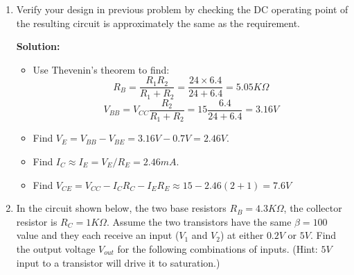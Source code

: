 \begin{enumerate}

 {\bf Solution:}
 
 \begin{itemize}
 \item Find $V_{CC}$: for the Q-point to be in the middle of the
   load line, we set $V_{CC}=2V_{CE}=2\times 7.5=15V$.
 \item Find $R_C$ and $R_E$: As $V_{CE}=V_{CC}-I_CR_C-I_ER_E\approx
   V_{CC}-I_C(R_C+R_E)$, we have $R_C+R_E=7.5/2.5\times 10^{-3}=3K\Omega$,
   i.e., $R_E=5K\Omega-R_C=1K\Omega$.
 \item Find desired $V_{BB}$: 
 	\[ V_{BB}=V_{be}+I_ER_E=0.7+2.5\times 10^{-3}\times 10^3=3.2V \]
 \item Find $R_B$: To satisfy $10R_B \le \beta_{min}R_E$, we let 
   $R_B=0.1\times \beta_{min} R_E=0.1\times 50\times 1000=5\;K\Omega$
 \item Find $R_1$ and $R_2$:
 \[	R_B=\frac{R_1R_2}{R_1+R_2}=5\;K\Omega \;\;\;\;\;\;\;\;
       V_{BB}=3.2V=V_{CC}\frac{R_2}{R_1+R_2}=15 \frac{R_2}{R_1+R_2} \]
 Solve these two equations (first divide the first equation by the second), 
 we obtain the two unknowns $R_1$ and $R_2$:
 \[	R_1=\frac{5\;K\Omega}{0.21}=24\;K\Omega \;\;\;\;\;\;\;\;\;
 	R_2=6.4\; K\Omega	\]
 \end{itemize}

\item Verify your design in previous problem by checking the DC operating
  point of the resulting circuit is approximately the same as the requirement.

{\bf Solution:}
\begin{itemize}
\item Use Thevenin's theorem to find:
  \[ R_B=\frac{R_1 R_2}{R_1+R_2}=\frac{24\times 6.4}{24+6.4}=5.05K\Omega \]
  \[ V_{BB}=V_{CC}\frac{R_2}{R_1+R_2}=15\frac{6.4}{24+6.4}=3.16V \]
\item Find $V_E=V_{BB}-V_{BE}=3.16V-0.7V=2.46V$.
\item Find $I_C \approx I_E=V_E/R_E=2.46 mA$.
\item Find $V_{CE}=V_{CC}-I_C R_C-I_E R_E\approx 15-2.46(2+1)=7.6V$
\end{itemize}



\item In the circuit shown below, the two base resistors $R_B=4.3K\Omega$,
the collector resistor is $R_C=1K\Omega$. Assume the two transistors
have the same $\beta=100$ value and they each receive an input ($V_1$ and
$V_2$) at either $0.2V$ or $5V$. Find the output voltage $V_{out}$ for
the following combinations of inputs. (Hint: $5V$ input to a transistor
will drive it to saturation.)


\end{enumerate}
